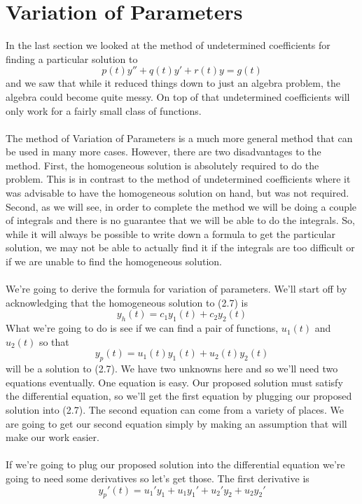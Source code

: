 \documentclass[10pt,reqno]{book}
\theoremstyle{definition}
\begin{document}
	\section{Variation of Parameters}
	In the last section we looked at the method of undetermined coefficients for finding a particular solution to
	\begin{equation}
		p(t)y'' + q(t)y' + r(t)y = g(t)
	\end{equation}
	and we saw that while it reduced things down to just an algebra problem, the algebra could become quite messy.  On top of that undetermined coefficients will only work for a fairly small class of functions.\\ \\
	The method of Variation of Parameters is a much more general method that can be used in many more cases. However, there are two disadvantages to the method.  First, the homogeneous solution is absolutely required to do the problem. This is in contrast to the method of undetermined coefficients where it was advisable to have the homogeneous solution on hand, but was not required. Second, as we will see, in order to complete the method we will be doing a couple of integrals and there is no guarantee that we will be able to do the integrals. So, while it will always be possible to write down a formula to get the particular solution, we may not be able to actually find it if the integrals are too difficult or if we are unable to find the homogeneous solution.\\ \\
	We're going to derive the formula for variation of parameters. We'll start off by acknowledging that the homogeneous solution to (2.7) is
	\[ y_h(t) = c_1 y_1(t) + c_2 y_2(t) \]
	What we’re going to do is see if we can find a pair of functions, $ u_1(t) $ and $ u_2(t) $ so that
	\[ y_p(t) = u_1(t) y_1(t) + u_2(t) y_2(t)  \]
	will be a solution to (2.7).  We have two unknowns here and so we'll need two equations eventually.  One equation is easy.  Our proposed solution must satisfy the differential equation, so we'll get the first equation by plugging our proposed solution into (2.7).  The second equation can come from a variety of places.  We are going to get our second equation simply by making an assumption that will make our work easier.\\ \\
	If we're going to plug our proposed solution into the differential equation we're going to need some derivatives so let's get those. The first derivative is
	\[ y_p'(t) = u_1' y_1 + u_1 y_1' + u_2' y_2 + u_2 y_2' \]
\end{document}
